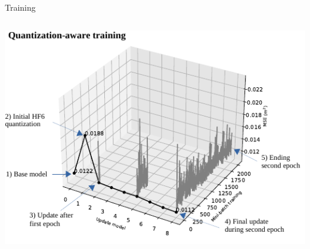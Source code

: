 \begin{frame}{Training}
\begin{columns}
		\centering
		\includegraphics[width=0.65\linewidth]{slides/figures/QAT.pdf} %
	\end{columns}
\end{frame}

